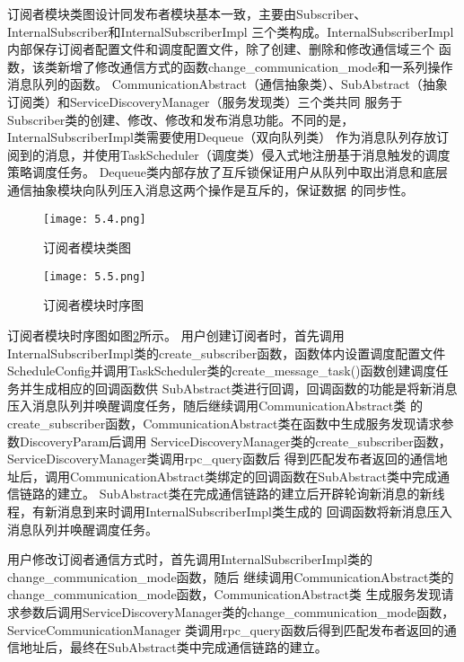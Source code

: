 订阅者模块类图设计同发布者模块基本一致，主要由Subscriber、InternalSubscriber和InternalSubscriberImpl
三个类构成。InternalSubscriberImpl内部保存订阅者配置文件和调度配置文件，除了创建、删除和修改通信域三个
函数，该类新增了修改通信方式的函数change\_communication\_mode和一系列操作消息队列的函数。
CommunicationAbstract（通信抽象类）、SubAbstract（抽象订阅类）和ServiceDiscoveryManager（服务发现类）三个类共同
服务于Subscriber类的创建、修改、修改和发布消息功能。不同的是，InternalSubscriberImpl类需要使用Dequeue（双向队列类）
作为消息队列存放订阅到的消息，并使用TaskScheduler（调度类）侵入式地注册基于消息触发的调度策略调度任务。
Dequeue类内部存放了互斥锁保证用户从队列中取出消息和底层通信抽象模块向队列压入消息这两个操作是互斥的，保证数据
的同步性。

\begin{figure}[htb]
  \centering
  \texttt{[image: 5.4.png]}
  \caption{订阅者模块类图}
  \label{subscriber_class}
\end{figure}

\begin{figure}[htb]
  \centering
  \texttt{[image: 5.5.png]}
  \caption{订阅者模块时序图}
  \label{subscriber_timesequence}
\end{figure}

订阅者模块时序图如图\ref{subscriber_timesequence}所示。
用户创建订阅者时，首先调用InternalSubscriberImpl类的create\_subscriber函数，函数体内设置调度配置文件
ScheduleConfig并调用TaskScheduler类的create\_message\_task()函数创建调度任务并生成相应的回调函数供
SubAbstract类进行回调，回调函数的功能是将新消息压入消息队列并唤醒调度任务，随后继续调用CommunicationAbstract类
的create\_subscriber函数，CommunicationAbstract类在函数中生成服务发现请求参数DiscoveryParam后调用
ServiceDiscoveryManager类的create\_subscriber函数，ServiceDiscoveryManager类调用rpc\_query函数后
得到匹配发布者返回的通信地址后，调用CommunicationAbstract类绑定的回调函数在SubAbstract类中完成通信链路的建立。
SubAbstract类在完成通信链路的建立后开辟轮询新消息的新线程，有新消息到来时调用InternalSubscriberImpl类生成的
回调函数将新消息压入消息队列并唤醒调度任务。

用户修改订阅者通信方式时，首先调用InternalSubscriberImpl类的change\_communication\_mode函数，随后
继续调用CommunicationAbstract类的change\_communication\_mode函数，CommunicationAbstract类
生成服务发现请求参数后调用ServiceDiscoveryManager类的change\_communication\_mode函数，ServiceCommunicationManager
类调用rpc\_query函数后得到匹配发布者返回的通信地址后，最终在SubAbstract类中完成通信链路的建立。

